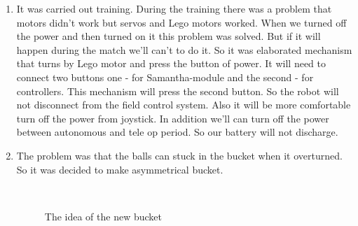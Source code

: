 \begin{enumerate}
\begin{enumerate}
		 \item It was carried out training. During the training there was a problem that motors didn't work but servos and Lego motors worked. When we turned off the power and then turned on it this problem was solved. But if it will happen during the match we'll can't to do it. So it was elaborated mechanism that turns by Lego motor and press the button of power. It will need to connect two buttons one - for Samantha-module and the second - for controllers. This mechanism will press the second button. So the robot will not disconnect from the field control system. Also it will be more comfortable turn off the power from joystick. In addition we'll can turn off the power between autonomous and tele op period. So our battery will not discharge.
		 
		 \item The problem was that the balls can stuck in the bucket when it overturned. So it was decided to make asymmetrical bucket.
		         \begin{figure}[H]
		         	\begin{minipage}[h]{0.2\linewidth}
		         		\center  
		         	\end{minipage}
		         	\begin{minipage}[h]{0.6\linewidth}
		         		\caption{The idea of the new bucket}
		         	\end{minipage}
		         \end{figure}
		 

\end{enumerate}
\end{enumerate}
